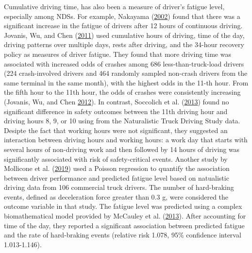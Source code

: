 \documentclass[12pt]{book}
\numberwithin{equation}{chapter}
\begin{document}
Cumulative driving time, has also been a measure of driver's fatigue level, especially among NDSs. For example, Nakayama (\protect\hyperlink{ref-nakayama2002trial}{2002}) found that there was a significant increase in the fatigue of drivers after 12 hours of continuous driving. Jovanis, Wu, and Chen (\protect\hyperlink{ref-jovanis2011hours}{2011}) used cumulative hours of driving, time of the day, driving patterns over multiple days, rests after driving, and the 34-hour recovery policy as measures of driver fatigue. They found that more driving time was associated with increased odds of crashes among 686 less-than-truck-load drivers (224 crash-involved drivers and 464 randomly sampled non-crash drivers from the same terminal in the same month), with the highest odds in the 11-th hour. From the fifth hour to the 11th hour, the odds of crashes were consistently increasing (Jovanis, Wu, and Chen \protect\hyperlink{ref-jovanis2012effects}{2012}). In contrast, Soccolich et al. (\protect\hyperlink{ref-soccolich2013analysis}{2013}) found no significant difference in safety outcomes between the 11th driving hour and driving hours 8, 9, or 10 using from the Naturalistic Truck Driving Study data. Desipte the fact that working hours were not significant, they suggested an interaction between driving hours and working hours: a work day that starts with several hours of non-driving work and then followed by 14 hours of driving was significantly associated with risk of safety-critical events. Another study by Mollicone et al. (\protect\hyperlink{ref-mollicone2019predicting}{2019}) used a Poisson regression to quantify the association between driver performance and predicted fatigue level based on natualistic driving data from 106 commercial truck drivers. The number of hard-braking events, defined as deceleration force greater than 0.3 g, were considered the outcome variable in that study. The fatigue level was predicted using a complex biomathematical model provided by McCauley et al. (\protect\hyperlink{ref-mccauley2013dynamic}{2013}). After accounting for time of the day, they reported a significant association between predicted fatigue and the rate of hard-braking events (relative risk 1.078, 95\% confidence interval 1.013-1.146).
\end{document}
